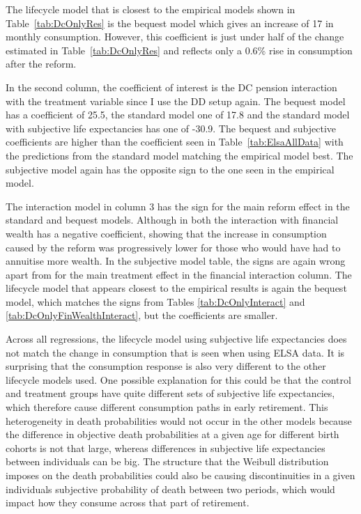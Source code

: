 \documentclass[12pt]{article}
\begin{document}
The lifecycle model that is closest to the empirical models shown in Table~\ref{tab:DcOnlyRes} is the bequest model which gives an increase of 17 in monthly consumption.
However, this coefficient is just under half of the change estimated in Table~\ref{tab:DcOnlyRes} and reflects only a 0.6\% rise in consumption after the reform.

In the second column, the coefficient of interest is the DC pension interaction
with the treatment variable since I use the DD setup again. The bequest model
has a coefficient of 25.5, the standard model one of 17.8 and the standard model
with subjective life expectancies has one of -30.9. The bequest and subjective
coefficients are higher than the coefficient seen in Table~\ref{tab:ElsaAllData}
with the predictions from the standard model matching the empirical model best.
The subjective model again has the opposite sign to the one seen in the
empirical model.

The interaction model in column 3 has the sign for the main
reform effect in the standard and bequest models. Although in both the
interaction with financial wealth has a negative coefficient, showing that the
increase in consumption caused by the reform was progressively lower for those
who would have had to annuitise more wealth. In the subjective model table, the
signs are again wrong apart from for the main treatment effect in the financial
interaction column. The lifecycle model that appears closest to the empirical
results is again the bequest model, which matches the signs from Tables
\ref{tab:DcOnlyInteract} and \ref{tab:DcOnlyFinWealthInteract}, but the
coefficients are smaller.

Across all regressions, the lifecycle model using subjective life expectancies
does not match the change in consumption that is seen when using ELSA data. It
is surprising that the consumption response is also very different to the other
lifecycle models used. One possible explanation for this could be that the
control and treatment groups have quite different sets of subjective life
expectancies, which therefore cause different consumption paths in early
retirement. This heterogeneity in death probabilities would not occur in the
other models because the difference in objective death probabilities at a given
age for different birth cohorts is not that large, whereas differences in
subjective life expectancies between individuals can be big. The structure that
the Weibull distribution imposes on the death probabilities could also be
causing discontinuities in a given individuals subjective probability of death
between two periods, which would impact how they consume across that part of
retirement.
\end{document}
